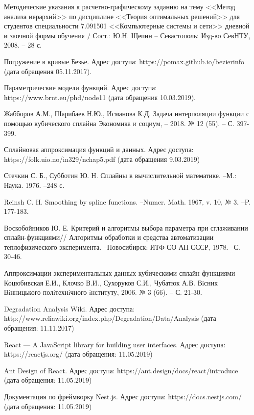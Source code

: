 \begin{thebibliography}{00}
    Методические указания к расчетно-графическому заданию
    на тему <<Метод анализа иерархий>>  по дисциплине <<Теория оптимальных решений>>
    для студентов специальности 7.091501 <<Компьютерные системы и сети>>
    дневной и заочной формы обучения /
    Сост.: Ю.Н. Щепин -- Севастополь:
    Изд-во СевНТУ, 2008. -- 28 с.

Погружение в кривые Безье. 
Адрес доступа: https://pomax.github.io/bezierinfo (дата обращения 05.11.2017).

Параметрические модели функций.
Адрес доступа: https://www.brnt.eu/phd/node11 (дата обращения 10.03.2019). 

Жабборов А.М., Шарибаев Н.Ю., Исманова К.Д.
Задача интерполяции функции с помощью кубического сплайна
Экономика и социум, -- 2018. № 12 (55). -- С. 397-399. 

Сплайновая аппроксимация функций и данных.
Адрес доступа: https://folk.uio.no/in329/nchap5.pdf (дата обращения 9.03.2019)

Стечкин С. Б., Субботин Ю. Н. Сплайны в вычислительной математике. --М.: 
Наука. 1976. --248 с.
    
Reinsh C. H. Smoothing by spline functions. --Numer. Math. 1967, v. 10, № 3. --P. 177-183. 	 

Воскобойников Ю. Е. Критерий и алгоритмы выбора параметра при сглаживании сплайн-функциями//
Алгоритмы обработки и средства автоматизации теплофизического эксперимента. --Новосибирск: ИТФ СО АН СССР, 1978. --С. 30-46.    

Аппроксимации экспериментальных данных кубическими сплайн-функциями
Коцюбивская Е.И., Клочко В.И., Сухоруков С.И., Чубатюк А.В.
Вiсник Вiнницького полiтехнiчного iнституту, 2006. № 3 (66). -- С. 21-30.

Degradation Analysis Wiki.
Адрес доступа: http://www.reliawiki.org/index.php/Degradation/Data/Analysis (дата обращения: 11.11.2017)

React --- A JavaScript library for building user interfaces.
Адрес доступа: https://reactjs.org/ (дата обращения: 11.05.2019)

Ant Design of React.
Адрес доступа: https://ant.design/docs/react/introduce (дата обращения: 11.05.2019)

Документация по фреймворку Nest.js.
Адрес доступа: https://docs.nestjs.com/ (дата обращения: 11.05.2019)
 

\end{thebibliography}
